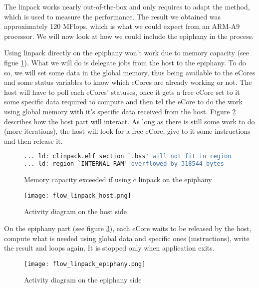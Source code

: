 The linpack works nearly out-of-the-box and only requires to adapt the  method, which is used to measure the performance. The result we obtained was approximately 120 MFlops, which is what we could expect from an ARM-A9 processor\cite{linpackpc}. We will now look at how we could include the \gls{epiphany} in the process.

Using linpack directly on the \gls{epiphany} won't work due to memory capacity (see figue \ref{code overflow}). What we will do is delegate jobs from the host to the \gls{epiphany}. To do so, we will set some data in the global memory, thus being available to the \glspl{eCore} and some status variables to know which \glspl{eCore} are already working or not. The host will have to poll each \glspl{eCore}' statuses, once it gets a free \gls{eCore} set to it some specific data required to compute and then tel the \gls{eCore} to do the work using global memory with it's specific data received from the host. Figure \ref{fig flow host} describes how the host part will interact. As long as there is still some work to do (more iterations), the host will look for a free \gls{eCore}, give to it some instructions and then release it.

\begin{figure}[h!]
\begin{lstlisting}[language=bash]
... ld: clinpack.elf section `.bss' will not fit in region `INTERNAL_RAM'
... ld: region `INTERNAL_RAM' overflowed by 318544 bytes
\end{lstlisting}
\caption{Memory capacity exceeded if using c linpack on the \gls{epiphany}}
\label{code overflow}
\end{figure}

\begin{figure}[h!]
\centering
\texttt{[image: flow\_linpack\_host.png]}
\caption{Activity diagram on the host side}
\label{fig flow host}
\end{figure}

On the \gls{epiphany} part (see figure \ref{fig flow epiphany}), each \gls{eCore} waits to be released by the host, compute what is needed using global data and specific ones (instructions), write the result and loops again. It is stopped only when application exits.

\begin{figure}[h!]
\centering
\texttt{[image: flow\_linpack\_epiphany.png]}
\caption{Activity diagram on the \gls{epiphany} side}
\label{fig flow epiphany}
\end{figure}

